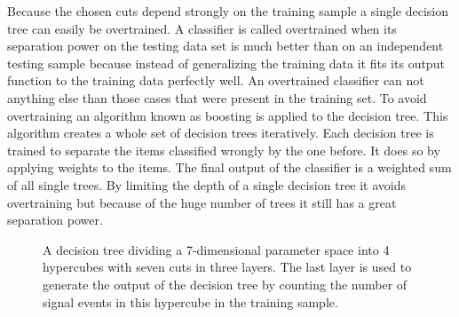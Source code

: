 Because the chosen cuts depend strongly on the training sample a single decision tree can easily be overtrained. A classifier is called overtrained when its separation power on the testing data set is much better than on an independent testing sample because instead of generalizing the training data it fits its output function to the training data perfectly well. An overtrained classifier can not anything else than those cases that were present in the training set. To avoid overtraining an algorithm known as boosting is applied to the decision tree. This algorithm creates a whole set of decision trees iteratively. Each decision tree is trained to separate the items classified wrongly by the one before. It does so by applying weights to the items. The final output of the classifier is a weighted sum of all single trees. By limiting the depth of a single decision tree it avoids overtraining but because of the huge number of trees it still has a great separation power.

\begin{figure}
  \centering
\caption[Decision Tree.]{A decision tree dividing a 7-dimensional parameter space into 4 hypercubes with seven cuts in three layers. The last layer is used to generate the output of the decision tree by counting the number of signal events in this hypercube in the training sample.}
\label{fig-decision-tree}
\end{figure}


